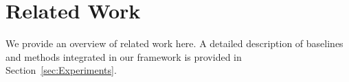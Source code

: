 \section{Related Work}
\label{sec:related-work}
We provide an overview of related work here. A detailed description of  baselines and methods integrated in our framework is provided in Section~\ref{sec:Experiments}.






